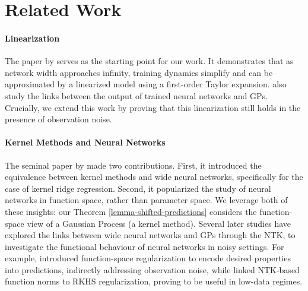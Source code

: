 \section{Related Work}
\paragraph{Linearization} The paper by \citet{lee2019wide} serves as the starting point for our work. It demonstrates that as network width approaches infinity, training dynamics simplify and can be approximated by a linearized model using a first-order Taylor expansion. \citet{lee2019wide} also study the links between the output of trained neural networks and GPs. Crucially, we extend this work by proving that this linearization still holds in the presence of observation noise.


\paragraph{Kernel Methods and Neural Networks} 
The seminal paper by \citet{jacot2018neural} made two contributions. First, it introduced the equivalence between kernel methods and wide neural networks, specifically for the case of kernel ridge regression. Second, it popularized the study of neural networks in function space, rather than parameter space. We leverage both of these insights: our Theorem \ref{lemma-shifted-predictions} considers the function-space view of a Gaussian Process (a kernel method).  Several later studies have explored the links between wide neural networks and GPs through the NTK, to investigate the functional behaviour of neural networks in noisy settings. For example, \citet{rudner2023functionspaceregularizationneuralnetworks} introduced function-space regularization to encode desired properties into predictions, indirectly addressing observation noise, while \citet{chen2022neural} linked NTK-based function norms to RKHS regularization, proving to be useful in low-data regimes.

